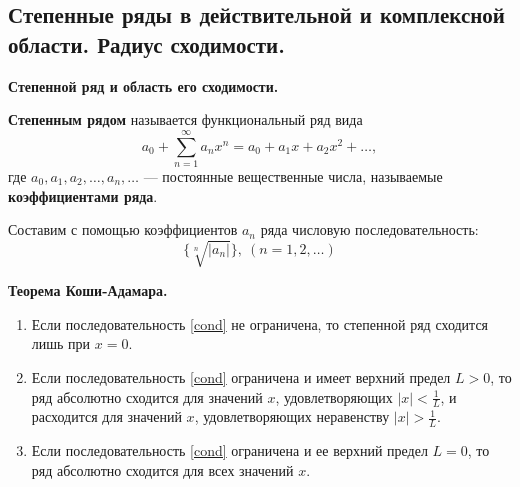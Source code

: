 \subsection{Степенные ряды в действительной и комплексной области. Радиус сходимости.}

\textbf{Степенной ряд и область его сходимости.}

\textbf{Степенным рядом} называется функциональный ряд вида
$$ a_0 + \displaystyle\sum_{n=1}^{\infty}a_n x^n =a_0 +a_1 x+a_2 x^2 +\dots,$$
где $a_0, a_1, a_2,\dots, a_n,\dots$ --- постоянные вещественные числа, называемые \textbf{коэффициентами ряда}.

Составим с помощью коэффициентов $a_n$ ряда числовую последовательность:
\begin{equation}
    \{\sqrt[n]{|a_n|}\},~(n = 1,2,\dots)
    \label{cond}
\end{equation}

\textbf{Теорема Коши-Адамара.}
\begin{enumerate}
    \item Если последовательность \ref{cond} не ограничена, то степенной ряд сходится лишь при $x = 0$.
    \item Если последовательность \ref{cond} ограничена и имеет верхний предел $L > 0$, то ряд абсолютно сходится для значений $x$, удовлетворяющих $|x| < \frac{1}{L}$, и расходится для значений $x$, удовлетворяющих неравенству $|x| > \frac{1}{L}$.
    \item Если последовательность \ref{cond} ограничена и ее верхний предел $L = 0$, то ряд абсолютно сходится для всех значений $x$.
\end{enumerate}

